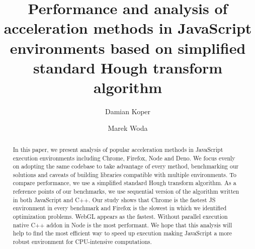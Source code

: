 \documentclass[runningheads]{llncs}
\begin{document}
%
\title{Performance and analysis of acceleration methods in JavaScript environments based on simplified standard Hough transform algorithm}
%

\author{Damian Koper \and Marek Woda}
%
%
%
\maketitle              %
%
\begin{abstract}
  In this paper, we present analysis of popular acceleration methods in JavaScript execution environments including Chrome, Firefox, Node and Deno.  We focus evenly on adopting the same codebase to take advantage of every method, benchmarking our solutions and caveats of building libraries compatible with multiple environments. To compare performance, we use a simplified standard Hough transform algorithm. As a reference points of our benchmarks, we use sequential version of the algorithm written in both JavaScript and C++. Our study shows that Chrome is the fastest JS environment in every benchmark and Firefox is the slowest in which we identified optimization problems. WebGL appears as the fastest. Without parallel execution native C++ addon in Node is the most performant. We hope that this analysis will help to find the most efficient way to speed up execution making JavaScript a more robust environment for CPU-intensive computations.

\end{abstract}






\clearpage
 


\end{document}
